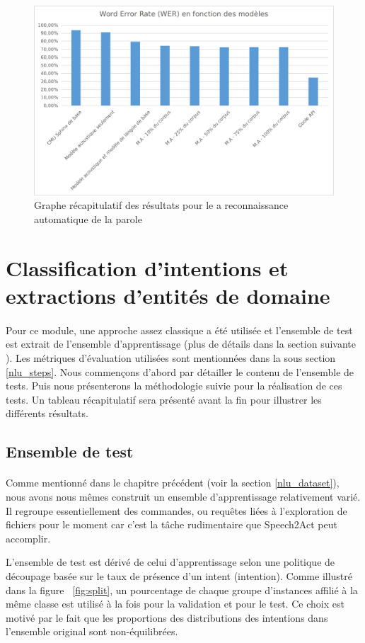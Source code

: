 	\begin{figure}[H]
		\centering
		\includegraphics[width=.9\linewidth]{images/implementation/asr_graph.png} 
		\caption{Graphe récapitulatif des résultats pour le a reconnaissance automatique de la parole}
		\label{fig:asr_results}
	\end{figure}
\section{Classification d'intentions et extractions d'entités de domaine}
\paragraph{}
Pour ce module, une approche assez classique a été utilisée et l'ensemble de test est extrait de l'ensemble d'apprentissage (plus de détails dans la section suivante ). Les métriques d'évaluation utilisées sont mentionnées dans la sous section \ref{nlu_steps}. Nous commençons d'abord par détailler le contenu de l'ensemble de tests. Puis nous présenterons la méthodologie suivie pour la réalisation de ces tests. Un tableau récapitulatif sera présenté avant la fin pour illustrer les différents résultats.
	\subsection{Ensemble de test}
	\paragraph{}
	Comme mentionné dans le chapitre précédent (voir la section \ref{nlu_dataset}), nous avons nous mêmes construit un ensemble d'apprentissage relativement varié. Il regroupe essentiellement des commandes, ou requêtes liées à l'exploration de fichiers pour le moment car c'est la tâche rudimentaire que Speech2Act peut accomplir.
	\par
	L'ensemble de test est dérivé de celui d'apprentissage selon une politique de découpage basée sur le taux de présence d'un intent (intention). Comme illustré dans la figure ~\ref{fig:split}, un pourcentage de chaque groupe d'instances affilié à la même classe est utilisé à la fois pour la validation et pour le test. Ce choix est motivé par le fait que les proportions des distributions des intentions dans l'ensemble original sont non-équilibrées.
	

